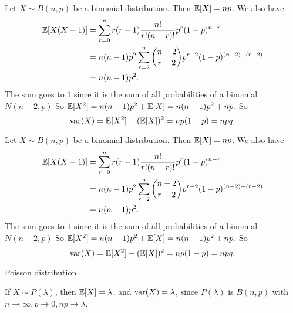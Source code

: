 \begin{note}
  \begin{field}
    \begin{eg}
      Let $X\sim B(n, p)$ be a binomial distribution. Then $\mathbb{E}[X] = np$. We also have
      \begin{align*}
        \mathbb{E}[X(X - 1)] &= \sum_{r = 0}^n r(r - 1)\frac{n!}{r!(n - r)!} p^r(1 - p)^{n - r}\\
        &= n(n - 1)p^2\sum_{r = 2}^n \binom{n - 2}{r - 2} p^{r - 2}(1 - p)^{(n - 2) - (r - 2)}\\
        &= n(n - 1)p^2.
      \end{align*}
      The sum goes to $1$ since it is the sum of all probabilities of a binomial $N(n - 2, p)$
      So $\mathbb{E}[X^2] = n(n - 1)p^2 + \mathbb{E}[X] = n(n - 1)p^2 + np$. So
      \[
        \operatorname{var}(X) = \mathbb{E}[X^2] - (\mathbb{E}[X])^2 = np(1 - p) = npq.
      \]
    \end{eg}
  \end{field}
  \begin{field}
    \begin{eg}
      Let $X\sim B(n, p)$ be a binomial distribution. Then $\mathbb{E}[X] = np$. We also have
      \begin{align*}
        \mathbb{E}[X(X - 1)] &= \sum_{r = 0}^n r(r - 1)\frac{n!}{r!(n - r)!} p^r(1 - p)^{n - r}\\
        &= n(n - 1)p^2\sum_{r = 2}^n \binom{n - 2}{r - 2} p^{r - 2}(1 - p)^{(n - 2) - (r - 2)}\\
        &= n(n - 1)p^2.
      \end{align*}
      The sum goes to $1$ since it is the sum of all probabilities of a binomial $N(n - 2, p)$
      So $\mathbb{E}[X^2] = n(n - 1)p^2 + \mathbb{E}[X] = n(n - 1)p^2 + np$. So
      \[
        \operatorname{var}(X) = \mathbb{E}[X^2] - (\mathbb{E}[X])^2 = np(1 - p) = npq.
      \]
    \end{eg}
  \end{field}
  \xplain{}%
\end{note}

%
\begin{note}
  \begin{field}
    Poisson distribution
  \end{field}
  \begin{field}
    \begin{eg}
      If $X\sim P(\lambda)$, then $\mathbb{E}[X] = \lambda$, and $\operatorname{var}(X) = \lambda$, since $P(\lambda)$ is $B(n, p)$ with $n\to \infty, p \to 0, np \to \lambda$.
    \end{eg}
  \end{field}
  \xplain{}%
\end{note}

